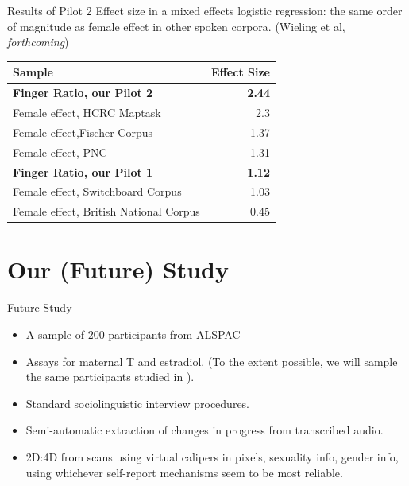 \documentclass[hyperref={pdfpagelabels=false}]{beamer}
\begin{document}
\begin{frame}{Results of Pilot 2}
\noindent Effect size in a mixed effects logistic regression: the same order of magnitude as female effect in other spoken corpora. (Wieling et al, \textsl{forthcoming})
\begin{center}
\begin{tabular}{l r}
\toprule
\textbf{Sample} & \textbf{Effect Size}\\
\midrule
\textbf{Finger Ratio, our Pilot 2} & \textbf{2.44}\\
Female effect, HCRC Maptask & 2.3\\
Female effect,Fischer Corpus & 1.37\\
Female effect, PNC & 1.31\\
\textbf{Finger Ratio, our Pilot 1} & \textbf{1.12}\\
Female effect, Switchboard Corpus & 1.03\\
Female effect, British National Corpus & 0.45\\
\bottomrule
\end{tabular}
\end{center}

\end{frame}




\section{Our (Future) Study}

\begin{frame}{Future Study}
\begin{itemize}
	\item A sample of 200 participants from ALSPAC
	\item Assays for maternal T and estradiol. (To the extent possible, we will sample the same participants studied in \citealt{hinesetal2002}). 
	\item Standard sociolinguistic interview procedures.
	\item Semi-automatic extraction of changes in progress from transcribed audio.
	\item 2D:4D from scans using virtual calipers in pixels, sexuality info, gender info, using whichever self-report mechanisms seem to be most reliable.
\end{itemize}
\end{frame}
\end{document}
